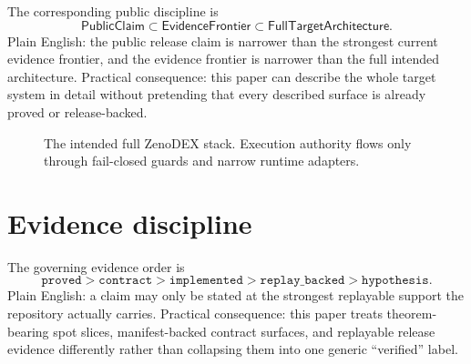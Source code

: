 \documentclass[10pt]{extarticle}
\begin{document}
The corresponding public discipline is
\[
\mathsf{PublicClaim} \subset \mathsf{EvidenceFrontier} \subset \mathsf{FullTargetArchitecture}.
\]
Plain English: the public release claim is narrower than the strongest
current evidence frontier, and the evidence frontier is narrower than the full
intended architecture.
Practical consequence: this paper can describe the whole target system in
detail without pretending that every described surface is already proved or
release-backed.

\begin{figure}[t]
\centering
{}
\caption{The intended full ZenoDEX stack. Execution authority flows only through fail-closed guards and narrow runtime adapters.}
\label{fig:stack}
\end{figure}

\section{Evidence discipline}
The governing evidence order is
\[
\mathtt{proved} > \mathtt{contract} > \mathtt{implemented} > \mathtt{replay\_backed} > \mathtt{hypothesis}.
\]
Plain English: a claim may only be stated at the strongest replayable
support the repository actually carries.
Practical consequence: this paper treats theorem-bearing spot slices,
manifest-backed contract surfaces, and replayable release evidence differently
rather than collapsing them into one generic ``verified'' label.
\end{document}
